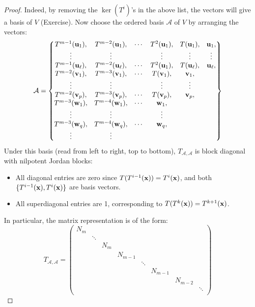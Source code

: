 \begin{proof}
Indeed, by removing the $\ker(T^i)$'s in the above list, the vectors will give a basis of $V$ (Exercise). Now choose the ordered basis \( \mathcal{A} \) of $V$ by arranging the vectors:
\[
\mathcal{A} = \left\{ 
\begin{matrix}
T^{m-1}({\bf u}_1), & T^{m-2}({\bf u}_1), & \cdots & T^2({\bf u}_1), & T({\bf u}_1), & {\bf u}_1, \\
\vdots & \vdots &  & \vdots & \vdots & \vdots\\
T^{m-1}({\bf u}_{\ell}), & T^{m-2}({\bf u}_{\ell}), & \cdots & T^2({\bf u}_1), & T({\bf u}_{\ell}), & {\bf u}_{\ell}, \\
T^{m-2}({\bf v}_1), & T^{m-3}({\bf v}_1), & \cdots & T({\bf v}_1), & {\bf v}_1, &  \\
\vdots & \vdots &  & \vdots & \vdots \\
T^{m-2}({\bf v}_p), & T^{m-3}({\bf v}_p), & \cdots & T({\bf v}_p), & {\bf v}_p, &  \\
T^{m-3}({\bf w}_1), & T^{m-4}({\bf w}_1), & \cdots & {\bf w}_1, &   \\
\vdots & \vdots &  & \vdots \\
T^{m-3}({\bf w}_q), & T^{m-4}({\bf w}_q), & \cdots & {\bf w}_q, &  \\
\vdots & \vdots
\end{matrix} \right\}
\]
Under this basis (read from left to right, top to bottom), \( T_{\mathcal{A},\mathcal{A}} \) is block diagonal with nilpotent Jordan blocks:
\begin{itemize}
  \item All diagonal entries are zero since \( T(T^{i-1}({\bf x})) = T^i({\bf x})\), and both $\{T^{i-1}({\bf x}), T^i({\bf x})\}$ are basis vectors.
  \item All superdiagonal entries are 1, corresponding to \( T(T^{k}({\bf x})) = T^{k+1}({\bf x}) \).
\end{itemize}
In particular, the matrix representation is of the form:
$$T_{\mathcal{A},\mathcal{A}} = \begin{pmatrix}
    N_m & & & & & &\\
    & \ddots & & & & & \\
    & & N_m & & & & \\
    & & & N_{m-1} & & & \\
    & & & & \ddots & & \\
    & & & & & N_{m-1} &  \\
    & & & & & & N_{m-2} \\
    & & & & & & & \ddots \\

\end{pmatrix}$$
\end{proof}
